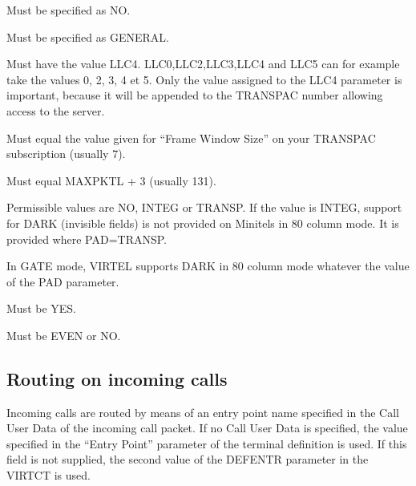 \documentclass[letterpaper,10pt,english]{sphinxmanual}
\begin{document}
\sphinxAtStartPar
{}
\begin{description}
\sphinxAtStartPar
Must be specified as NO.

\sphinxAtStartPar
Must be specified as GENERAL.

\sphinxAtStartPar
Must have the value LLC4. LLC0,LLC2,LLC3,LLC4 and LLC5 can for example take the values 0, 2, 3, 4 et 5. Only the value assigned to the LLC4 parameter is important, because it will be appended to the TRANSPAC number allowing access to the server.

\sphinxAtStartPar
Must equal the value given for “Frame Window Size” on your TRANSPAC subscription (usually 7).

\sphinxAtStartPar
Must equal MAXPKTL + 3 (usually 131).

\sphinxAtStartPar
Permissible values are NO, INTEG or TRANSP. If the value is INTEG, support for DARK (invisible fields) is not provided on Minitels in
80 column mode. It is provided where PAD=TRANSP.

\sphinxAtStartPar
In GATE mode, VIRTEL supports DARK in 80 column mode whatever the value of the PAD parameter.

\sphinxAtStartPar
Must be YES.

\sphinxAtStartPar
Must be EVEN or NO.

\end{description}

\ignorespaces 

\subsection{Routing on incoming calls}
\label{\detokenize{connectivity_guide:routing-on-incoming-calls}}\label{\detokenize{connectivity_guide:index-67}}
\sphinxAtStartPar
Incoming calls are routed by means of an entry point name specified in the Call User Data of the incoming call packet. If no Call User Data is specified, the value specified in the “Entry Point” parameter of the terminal definition is used. If this field is not supplied, the second value of the DEFENTR parameter in the VIRTCT is used.
\end{document}
